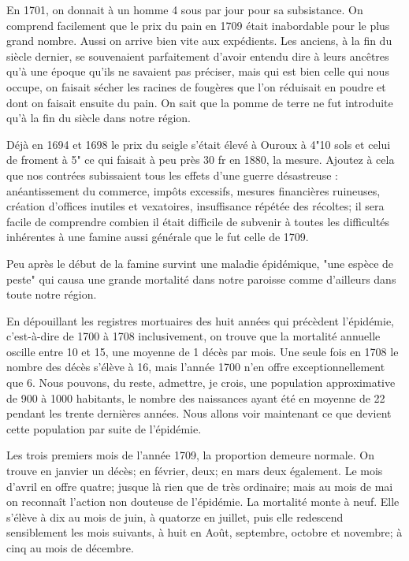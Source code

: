En 1701, on donnait à un homme 4 sous par jour pour sa subsistance. On comprend facilement que le prix du pain en 1709 était inabordable pour le plus grand nombre. Aussi on arrive bien vite aux expédients. Les anciens, à la fin du siècle dernier, se souvenaient parfaitement d'avoir entendu dire à leurs ancêtres qu'à une époque qu'ils ne savaient pas préciser, mais qui est bien celle qui nous occupe, on faisait sécher les racines de fougères que l'on réduisait en poudre et dont on faisait ensuite du pain. On sait que la pomme de terre ne fut introduite qu'à la fin du siècle dans notre région.

Déjà en 1694 et 1698 le prix du seigle s'était élevé à Ouroux à 4"10 sols et celui de froment à 5" ce qui faisait à peu près 30 fr en 1880, la mesure. Ajoutez à cela que nos contrées subissaient tous les effets d'une guerre désastreuse : anéantissement du commerce, impôts excessifs, mesures financières ruineuses, création d'offices
inutiles et vexatoires, insuffisance répétée des récoltes; il sera facile de comprendre combien il était difficile de subvenir à toutes les difficultés inhérentes à une famine aussi générale que le fut celle de 1709.

Peu après le début de la famine survint une maladie épidémique, "une espèce de peste" qui causa une grande mortalité dans notre paroisse comme d'ailleurs dans toute notre région.

En dépouillant les registres mortuaires des huit années qui précèdent l'épidémie, c'est-à-dire de 1700 à 1708 inclusivement, on trouve que la mortalité annuelle oscille entre 10 et 15, une moyenne de 1 décès par mois. Une seule fois en 1708 le nombre des décès s'élève à 16, mais l'année 1700 n'en offre exceptionnellement que 6. Nous pouvons, du reste, admettre, je crois, une population approximative de 900 à 1000 habitants, le nombre des naissances ayant été en moyenne de 22 pendant les trente dernières années. Nous allons voir maintenant ce que devient cette population par suite de l'épidémie.

Les trois premiers mois de l'année 1709, la proportion demeure normale. On trouve en janvier un décès; en février, deux; en mars deux également. Le mois d'avril en offre quatre; jusque là rien que de très ordinaire; mais au mois de mai on reconnaît l'action non douteuse de l'épidémie. La mortalité monte à neuf. Elle s'élève à dix au mois de juin, à quatorze en juillet, puis elle redescend sensiblement les mois suivants, à huit en Août, septembre, octobre et novembre; à cinq au mois de décembre.


